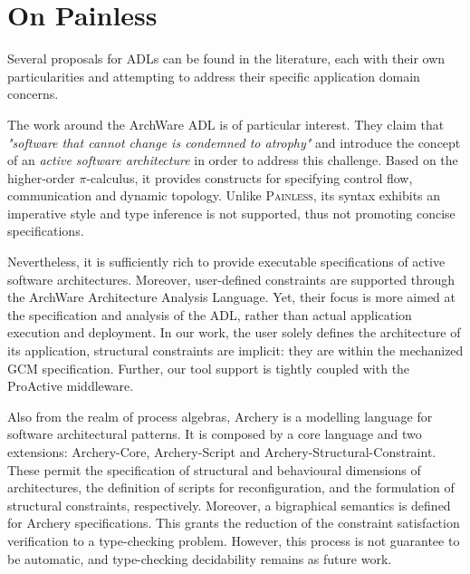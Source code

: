 \section{On Painless}
\label{sec:relpainless}

	Several proposals for \ac{ADL}s can be found in the literature, each with their own 
	particularities and attempting to 
	address their specific application domain concerns. 
	
	The work around the ArchWare \ac{ADL} \cite{DBLP:journals/corr/abs-1006-4829} 
	is of particular interest. They claim that 
	\textit{"software that cannot change is condemned to atrophy"}	
	and introduce the concept of an \textit{active software architecture} in order
	to address this challenge. Based on the higher-order $\pi$-calculus, it provides
	constructs for specifying control flow, communication and dynamic topology.
	Unlike \textsc{Painless}, its syntax exhibits an imperative style 
	and type inference is not supported, thus not promoting concise specifications. 
	
	Nevertheless, it is sufficiently rich to provide executable specifications of active software
	architectures. Moreover, user-defined constraints are supported through the ArchWare 
	Architecture Analysis Language. Yet, their focus is more aimed at the specification
	and analysis of the \ac{ADL}, rather than actual application execution and deployment.
	In our work, the user solely defines the architecture of its application, structural constraints
	are implicit: they are within the mechanized \ac{GCM} specification.	Further, our tool support
	is tightly coupled with the ProActive middleware.
	
		
		Also from the realm of process algebras, Archery \cite{conf/facs2/SanchezBR11} is a modelling
	language for software architectural patterns. It is composed by a core language and two extensions:
	\textsf{Archery-Core}, \textsf{Archery-Script} and \textsf{Archery-Structural-Constraint}.
	These permit the specification of structural and behavioural dimensions of architectures,
	the definition of scripts for  reconfiguration, and the formulation of structural constraints,
	respectively. Moreover, a bigraphical semantics is defined for Archery specifications. This grants
	the reduction of the constraint satisfaction verification to a type-checking problem. However,
	this process is not guarantee to be automatic, and type-checking decidability remains as future work.
	
